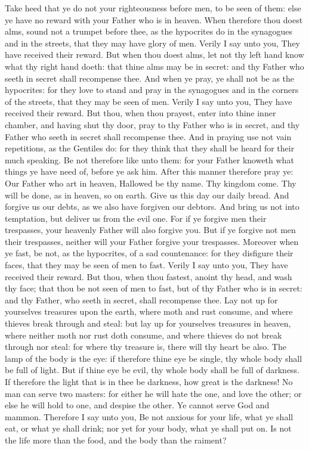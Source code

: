 Take heed that ye do not your righteousness before men, to be seen of them: else ye have no reward with your Father who is in heaven.  When therefore thou doest alms, sound not a trumpet before thee, as the hypocrites do in the synagogues and in the streets, that they may have glory of men. Verily I say unto you, They have received their reward. But when thou doest alms, let not thy left hand know what thy right hand doeth: that thine alms may be in secret: and thy Father who seeth in secret shall recompense thee.  And when ye pray, ye shall not be as the hypocrites: for they love to stand and pray in the synagogues and in the corners of the streets, that they may be seen of men. Verily I say unto you, They have received their reward. But thou, when thou prayest, enter into thine inner chamber, and having shut thy door, pray to thy Father who is in secret, and thy Father who seeth in secret shall recompense thee. And in praying use not vain repetitions, as the Gentiles do: for they think that they shall be heard for their much speaking. Be not therefore like unto them: for your Father knoweth what things ye have need of, before ye ask him. After this manner therefore pray ye: Our Father who art in heaven, Hallowed be thy name. Thy kingdom come. Thy will be done, as in heaven, so on earth. Give us this day our daily bread. And forgive us our debts, as we also have forgiven our debtors. And bring us not into temptation, but deliver us from the evil one. For if ye forgive men their trespasses, your heavenly Father will also forgive you. But if ye forgive not men their trespasses, neither will your Father forgive your trespasses.  Moreover when ye fast, be not, as the hypocrites, of a sad countenance: for they disfigure their faces, that they may be seen of men to fast. Verily I say unto you, They have received their reward. But thou, when thou fastest, anoint thy head, and wash thy face; that thou be not seen of men to fast, but of thy Father who is in secret: and thy Father, who seeth in secret, shall recompense thee.  Lay not up for yourselves treasures upon the earth, where moth and rust consume, and where thieves break through and steal: but lay up for yourselves treasures in heaven, where neither moth nor rust doth consume, and where thieves do not break through nor steal: for where thy treasure is, there will thy heart be also. The lamp of the body is the eye: if therefore thine eye be single, thy whole body shall be full of light. But if thine eye be evil, thy whole body shall be full of darkness. If therefore the light that is in thee be darkness, how great is the darkness! No man can serve two masters: for either he will hate the one, and love the other; or else he will hold to one, and despise the other. Ye cannot serve God and mammon. Therefore I say unto you, Be not anxious for your life, what ye shall eat, or what ye shall drink; nor yet for your body, what ye shall put on. Is not the life more than the food, and the body than the raiment? 